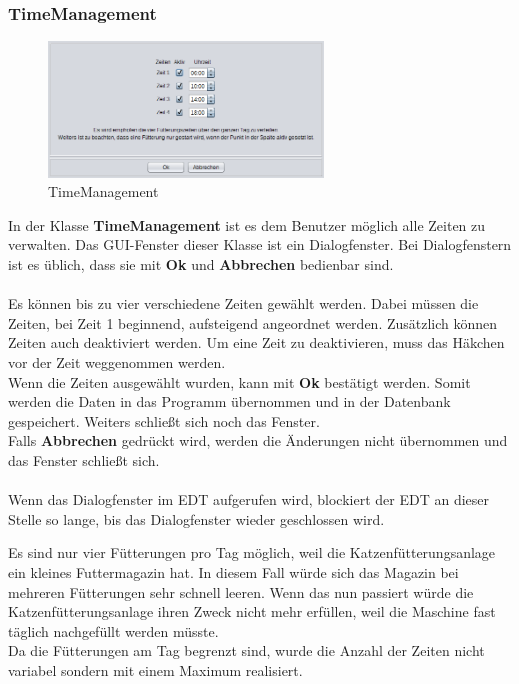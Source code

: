 \subsubsection{TimeManagement}\label{subsubsec:TimeManagement}
\begin{figure}
\vspace{-20pt}
  \begin{center}
    \includegraphics[width=0.65\textwidth]{Bilder/GUI/TimeManagement}
  \end{center}
  \caption{TimeManagement}
  \label{TimeManagement}
  \vspace{0pt}
\end{figure}
In der Klasse \textbf{TimeManagement} ist es dem Benutzer möglich alle Zeiten zu verwalten. Das \ac{GUI}-Fenster dieser Klasse ist ein Dialogfenster. Bei Dialogfenstern ist es üblich, dass sie mit \textbf{Ok} und \textbf{Abbrechen} bedienbar sind.
\\ \\ Es können bis zu vier verschiedene Zeiten gewählt werden. Dabei müssen die Zeiten, bei Zeit 1 beginnend, aufsteigend angeordnet werden. Zusätzlich können Zeiten auch deaktiviert werden. Um eine Zeit zu deaktivieren, muss das Häkchen vor der Zeit weggenommen werden.
\\ Wenn die Zeiten ausgewählt wurden, kann mit \textbf{Ok} bestätigt werden. Somit werden die Daten in das Programm übernommen und in der Datenbank gespeichert. Weiters schließt sich noch das Fenster.
\\ Falls \textbf{Abbrechen} gedrückt wird, werden die Änderungen nicht übernommen und das Fenster schließt sich.
\\ \\ Wenn das Dialogfenster im \ac{EDT} aufgerufen wird, blockiert der \ac{EDT} an dieser Stelle so lange, bis das Dialogfenster wieder geschlossen wird.

\vspace{10pt}

Es sind nur vier Fütterungen pro Tag möglich, weil die Katzenfütterungsanlage ein kleines Futtermagazin hat. In diesem Fall würde sich das Magazin bei mehreren Fütterungen sehr schnell leeren. Wenn das nun passiert würde die Katzenfütterungsanlage ihren Zweck nicht mehr erfüllen, weil die Maschine fast täglich nachgefüllt werden müsste.
\\ Da die Fütterungen am Tag begrenzt sind, wurde die Anzahl der Zeiten nicht variabel sondern mit einem Maximum realisiert.

